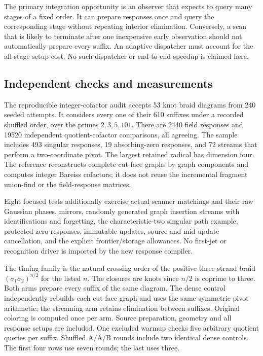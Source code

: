 The primary integration opportunity is an observer that expects to
query many stages of a fixed order.  It can prepare responses once
and query the corresponding stage without repeating interior
elimination.  Conversely, a scan that is likely to terminate after
one inexpensive early observation should not automatically prepare
every suffix.  An adaptive dispatcher must account for the all-stage
setup cost.  No such dispatcher or end-to-end speedup is claimed here.

\subsection{Independent checks and measurements}

The reproducible integer-cofactor audit accepts 53 knot braid diagrams
from 240 seeded attempts.  It considers every one of their 610 suffixes
under a recorded shuffled order, over the primes $2,3,5,101$.
There are 2440 field responses and 19520 independent quotient-cofactor
comparisons, all agreeing.  The sample includes 493 singular responses,
19 absorbing-zero responses, and 72 streams that perform a
two-coordinate pivot.  The largest retained radical has dimension four.
The reference reconstructs complete cut-face graphs by graph components
and computes integer Bareiss cofactors; it does not reuse the incremental
fragment union-find or the field-response matrices.

Eight focused tests additionally exercise actual scanner matchings and
their raw Gaussian phases, mirrors, randomly generated graph insertion
streams with identifications and forgetting, the characteristic-two
singular path example, protected zero responses, immutable updates,
source and mid-update cancellation, and the explicit frontier/storage
allowances.  No first-jet or recognition driver is imported by the new
response compiler.

The timing family is the natural crossing order of the positive
three-strand braid $(\sigma_1\sigma_2)^{n/2}$ for the listed $n$.
The closures are knots since $n/2$ is coprime to three.  Both arms
prepare every suffix of the same diagram.  The dense control independently
rebuilds each cut-face graph and uses the same symmetric pivot arithmetic;
the streaming arm retains elimination between suffixes.  Original
coloring is computed once per arm.  Source preparation, geometry and
all response setups are included.  One excluded warmup checks five
arbitrary quotient queries per suffix.  Shuffled A/A/B rounds include
two identical dense controls.  The first four rows use seven rounds;
the last uses three.

